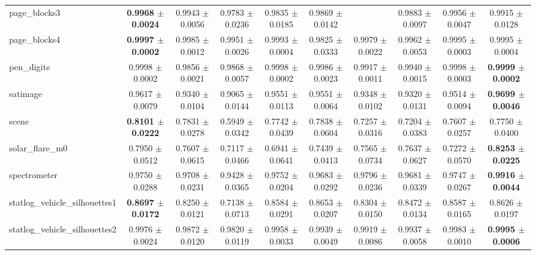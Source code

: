 \begin{table*}[htbp]
\begin{tabular}{lccccccccc}
            page\_blocks3 & \cellcolor{graybg}\textbf{0.9968 $\pm$ 0.0024} & 0.9943 $\pm$ 0.0056 & 0.9783 $\pm$ 0.0236 & 0.9835 $\pm$ 0.0185 & 0.9869 $\pm$ 0.0142 &  & 0.9883 $\pm$ 0.0097 & 0.9956 $\pm$ 0.0047 & 0.9915 $\pm$ 0.0128 \\ 
            page\_blocks4 & \cellcolor{graybg}\textbf{0.9997 $\pm$ 0.0002} & 0.9985 $\pm$ 0.0012 & 0.9951 $\pm$ 0.0026 & 0.9993 $\pm$ 0.0004 & 0.9825 $\pm$ 0.0333 & 0.9979 $\pm$ 0.0022 & 0.9962 $\pm$ 0.0053 & 0.9995 $\pm$ 0.0003 & 0.9995 $\pm$ 0.0004 \\ 
            pen\_digits & 0.9998 $\pm$ 0.0002 & 0.9856 $\pm$ 0.0021 & 0.9868 $\pm$ 0.0057 & 0.9998 $\pm$ 0.0002 & 0.9986 $\pm$ 0.0023 & 0.9917 $\pm$ 0.0011 & 0.9940 $\pm$ 0.0015 & 0.9998 $\pm$ 0.0003 & \cellcolor{graybg}\textbf{0.9999 $\pm$ 0.0002} \\ 
            satimage & 0.9617 $\pm$ 0.0079 & 0.9340 $\pm$ 0.0104 & 0.9065 $\pm$ 0.0144 & 0.9551 $\pm$ 0.0113 & 0.9551 $\pm$ 0.0064 & 0.9348 $\pm$ 0.0102 & 0.9320 $\pm$ 0.0131 & 0.9514 $\pm$ 0.0094 & \cellcolor{graybg}\textbf{0.9699 $\pm$ 0.0046} \\ 
            scene & \cellcolor{graybg}\textbf{0.8101 $\pm$ 0.0222} & 0.7831 $\pm$ 0.0278 & 0.5949 $\pm$ 0.0342 & 0.7742 $\pm$ 0.0439 & 0.7838 $\pm$ 0.0604 & 0.7257 $\pm$ 0.0316 & 0.7204 $\pm$ 0.0383 & 0.7607 $\pm$ 0.0257 & 0.7750 $\pm$ 0.0400 \\ 
            solar\_flare\_m0 & 0.7950 $\pm$ 0.0512 & 0.7607 $\pm$ 0.0615 & 0.7117 $\pm$ 0.0466 & 0.6941 $\pm$ 0.0641 & 0.7439 $\pm$ 0.0413 & 0.7565 $\pm$ 0.0734 & 0.7637 $\pm$ 0.0627 & 0.7272 $\pm$ 0.0570 & \cellcolor{graybg}\textbf{0.8253 $\pm$ 0.0225} \\ 
            spectrometer & 0.9750 $\pm$ 0.0288 & 0.9708 $\pm$ 0.0231 & 0.9428 $\pm$ 0.0365 & 0.9752 $\pm$ 0.0204 & 0.9683 $\pm$ 0.0292 & 0.9796 $\pm$ 0.0236 & 0.9681 $\pm$ 0.0339 & 0.9747 $\pm$ 0.0267 & \cellcolor{graybg}\textbf{0.9916 $\pm$ 0.0044} \\ 
            statlog\_vehicle\_silhouettes1 & \cellcolor{graybg}\textbf{0.8697 $\pm$ 0.0172} & 0.8250 $\pm$ 0.0121 & 0.7138 $\pm$ 0.0713 & 0.8584 $\pm$ 0.0291 & 0.8653 $\pm$ 0.0207 & 0.8304 $\pm$ 0.0150 & 0.8472 $\pm$ 0.0134 & 0.8587 $\pm$ 0.0165 & 0.8626 $\pm$ 0.0197 \\ 
            statlog\_vehicle\_silhouettes2 & 0.9976 $\pm$ 0.0024 & 0.9872 $\pm$ 0.0120 & 0.9820 $\pm$ 0.0119 & 0.9958 $\pm$ 0.0033 & 0.9939 $\pm$ 0.0049 & 0.9919 $\pm$ 0.0086 & 0.9937 $\pm$ 0.0058 & 0.9983 $\pm$ 0.0010 & \cellcolor{graybg}\textbf{0.9995 $\pm$ 0.0006} \\ 

\end{tabular}
\end{table*}
